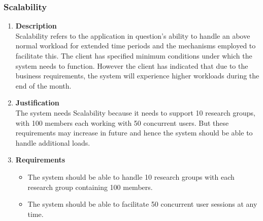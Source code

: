 \documentclass[a4paper,10pt]{article}
\begin{document}
\subsubsection{Scalability}
\begin{enumerate}
\item \textbf{Description} \\
Scalability refers to the application in question's ability to handle an above normal workload for extended time periods and the mechanisms employed to facilitate this. The client has specified minimum conditions under which the system needs to function. However the client has indicated that due to the business requirements, the system will experience higher workloads during the end of the month.
\item \textbf{Justification} \\
The system needs Scalability because it needs to support 10 research groups, with 100 members each working with 50 concurrent users. But these requirements may increase in future and hence the system should be able to handle additional loads.
\item \textbf{Requirements}
	\begin{itemize}
		\item The system should be able to handle 10 research groups with each research group containing 100 members.
		\item The system should be able to facilitate 50 concurrent user sessions at any time.
	\end{itemize}
\end{enumerate}
\end{document}
